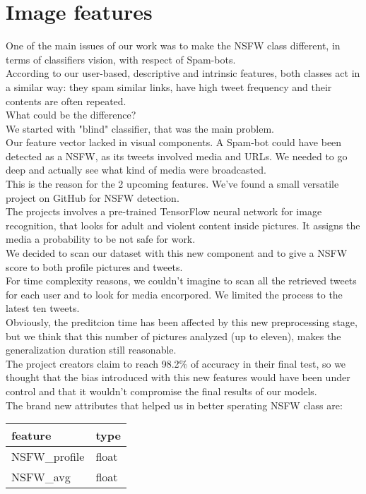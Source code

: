 \section{Image features}
One of the main issues of our work was to make the NSFW class different, in terms of classifiers vision, with respect of Spam-bots.\\
According to our user-based, descriptive and intrinsic features, both classes act in a similar way: they spam similar links, have high tweet frequency and their contents are often repeated.\\
What could be the difference?\\
We started with "blind" classifier, that was the main problem.\\ Our feature vector lacked in visual components. A Spam-bot could have been detected as a NSFW, as its tweets involved media and URLs. We needed to go deep and actually see what kind of media were broadcasted.\\
This is the reason for the 2 upcoming features. We've found a small versatile project on GitHub for NSFW detection.\\
The projects involves a pre-trained TensorFlow neural network for image recognition, that looks for adult and violent content inside pictures. It assigns the media a probability to be not safe for work.\\
We decided to scan our dataset with this new component and to give a NSFW score to both profile pictures and tweets.\\
For time complexity reasons, we couldn't imagine to scan all the retrieved tweets for each user and to look for media encorpored. We limited the process to the latest ten tweets.\\
Obviously, the preditcion time has been affected by this new preprocessing stage, but we think that this number of pictures analyzed (up to eleven), makes the generalization duration still reasonable.\\
The project creators claim to reach 98.2\% of accuracy in their final test, so we thought that the bias introduced with this new features would have been under control and that it wouldn't compromise the final results of our models.\\
The brand new attributes that helped us in better sperating NSFW class are:
\small
\begin{center}
	\begin{tabular}{ll}
		\\feature&type\\
		\hline\hline
		NSFW\_profile&float\\
		NSFW\_avg&float\\\hline
	\end{tabular}
\end{center}
\normalsize